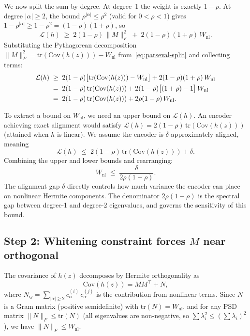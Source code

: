 We now split the sum by degree. At degree~1 the weight is exactly
$1 - \rho$. At degree $|\alpha| \geq 2$, the bound
$\rho^{|\alpha|} \leq \rho^2$ (valid for $0 < \rho < 1$) gives
$1 - \rho^{|\alpha|} \geq 1 - \rho^2 = (1-\rho)(1+\rho)$, so
\begin{equation}
    \mathcal{L}(h) \;\geq\; 2(1-\rho)\,\|M\|_F^2
    \;+\; 2(1-\rho)(1+\rho)\, W_{\mathrm{nl}}.
\end{equation}
Substituting the Pythagorean decomposition
$\|M\|_F^2 = \mathrm{tr}(\mathrm{Cov}(h(z))) - W_{\mathrm{nl}}$
from~\eqref{eq:parseval-split} and collecting terms:
\begin{align}
    \mathcal{L}(h)
    &\;\geq\; 2(1-\rho)\bigl[\mathrm{tr}(\mathrm{Cov}(h(z)))
        - W_{\mathrm{nl}}\bigr]
        + 2(1-\rho)(1+\rho)\, W_{\mathrm{nl}} \notag\\
    &\;=\; 2(1-\rho)\,\mathrm{tr}(\mathrm{Cov}(h(z)))
        + 2(1-\rho)\bigl[(1+\rho) - 1\bigr]\, W_{\mathrm{nl}} \notag\\
    &\;=\; 2(1-\rho)\,\mathrm{tr}(\mathrm{Cov}(h(z)))
        + 2\rho(1-\rho)\, W_{\mathrm{nl}}.
\end{align}

To extract a bound on $W_{\mathrm{nl}}$, we need an upper bound on
$\mathcal{L}(h)$. An encoder achieving exact alignment would satisfy
$\mathcal{L}(h) = 2(1-\rho)\,\mathrm{tr}(\mathrm{Cov}(h(z)))$
(attained when $h$ is linear). We assume the encoder is
$\delta$-approximately aligned, meaning
\begin{equation}
    \mathcal{L}(h) \;\leq\;
    2(1-\rho)\,\mathrm{tr}(\mathrm{Cov}(h(z))) + \delta.
\end{equation}
Combining the upper and lower bounds and rearranging:
\begin{equation}\label{eq:wnl-bound}
    \boxed{W_{\mathrm{nl}} \;\leq\; \frac{\delta}{2\rho(1-\rho)}.}
\end{equation}
The alignment gap $\delta$ directly controls how much variance the
encoder can place on nonlinear Hermite components. The denominator
$2\rho(1-\rho)$ is the spectral gap between degree-1 and degree-2
eigenvalues, and governs the sensitivity of this bound.


 
\subsection{Step 2: Whitening constraint forces $M$ near orthogonal}
 
The covariance of $h(z)$ decomposes by Hermite orthogonality as
\begin{equation}
    \mathrm{Cov}(h(z)) = MM^\top + N,
\end{equation}
where $N_{ij} = \sum_{|\alpha| \geq 2} c_\alpha^{(i)}\, c_\alpha^{(j)}$ is the
contribution from nonlinear terms. Since $N$ is a Gram matrix (positive
semidefinite) with $\mathrm{tr}(N) = W_{\mathrm{nl}}$, and for any PSD matrix
$\|N\|_F \leq \mathrm{tr}(N)$ (all eigenvalues are non-negative, so
$\sum \lambda_i^2 \leq (\sum \lambda_i)^2$), we have
$\|N\|_F \leq W_{\mathrm{nl}}$.
 
